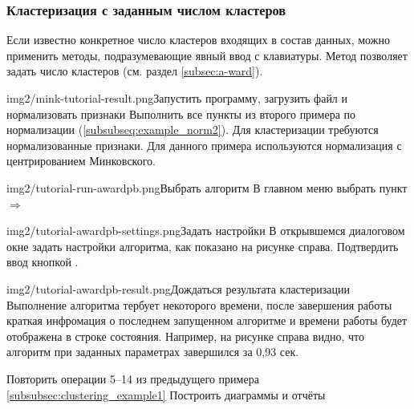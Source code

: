 \documentclass[12pt,tikz]{instruction}
\begin{document}
\newpage
\subsubsection{Кластеризация с заданным числом кластеров}

Если известно конкретное число кластеров входящих в состав данных, можно применить методы, подразумевающие явный ввод с клавиатуры. Метод \AWard позволяет задать число кластеров (см. раздел \ref{subsec:a-ward}).

\begin{steps}
	\begin{ist}{img2/mink-tutorial-result.png}{Запустить программу, загрузить файл и нормализовать признаки}
		Выполнить все пункты из второго примера по нормализации (\ref{subsubseq:example_norm2}). Для кластеризации требуются нормализованные признаки. Для данного примера используются нормализация с центрированием Минковского.
	\end{ist}
	\begin{ist}{img2/tutorial-run-awardpb.png}{Выбрать алгоритм \AWardpb}
		В главном меню выбрать пункт  $ \Rightarrow $ \menu{\AWardpb}
	\end{ist}
	\begin{ist}{img2/tutorial-awardpb-settings.png}{Задать настройки}
		В открывшемся диалоговом окне задать настройки алгоритма, как показано на рисунке справа. Подтвердить ввод кнопкой .\vspace{5cm}
	\end{ist}
	\begin{ist}{img2/tutorial-awardpb-result.png}{Дождаться результата кластеризации}
		Выполнение алгоритма тербует некоторого времени, после завершения работы краткая инфромация о последнем запущенном алгоритме и времени работы будет отображена в строке состояния. Например, на рисунке справа видно, что алгоритм \AWardpb при заданных параметрах завершился за 0,93 сек.
	\end{ist}
	\begin{istt}{Повторить операции 5--14 из предыдущего примера \ref{subsubsec:clustering_example1} }{Построить диаграммы и отчёты}
	\end{istt}
	
		
\end{steps}


{} %
\glsaddall

\printglossary[type=\acronymtype,nonumberlist,style=acrostyle]

\newpage
{}
\printglossary[nonumberlist]

\newpage
\nocite{amorim} \nocite{ward} \nocite{boley} \nocite{tasoulis} \nocite{kovaleva} \nocite{mirkin}

\end{document}

